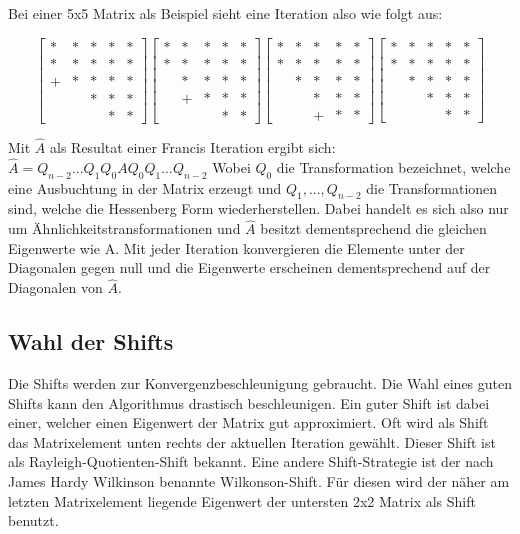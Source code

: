 Bei einer 5x5 Matrix als Beispiel sieht eine Iteration also wie folgt aus:

\begin{equation}
	\begin{bmatrix}
	* & * & * & * & *  \\
	* & * & *  & * & *  \\
	+ & * & * & * & *\\
	&   & * & * & * \\
	&   &   & * & * 
	\end{bmatrix}
	\begin{bmatrix}
	* & * & * & * & *  \\
	* & * & *  & * & *  \\
	& * & * & * & *\\
	&  + & * & * & * \\
	&   &   & * & * 
	\end{bmatrix}
	\begin{bmatrix}
	* & * & * & * & *  \\
	* & * & *  & * & *  \\
	& * & * & * & *\\
	&   & * & * & * \\
	&   &  + & * & * 
	\end{bmatrix}
	\begin{bmatrix}
	* & * & * & * & *  \\
	* & * & *  & * & *  \\
	& * & * & * & *\\
	&   & * & * & * \\
	&   &   & * & * 
	\end{bmatrix}
\end{equation}

Mit $\hat{A}$ als Resultat einer Francis Iteration ergibt sich: $\hat{A}=Q_{n-2}...Q_{1}Q_{0}AQ_{0}Q_{1}...Q_{n-2}$
Wobei $Q_{0}$ die Transformation bezeichnet, welche eine Ausbuchtung in der Matrix erzeugt und $Q_{1},...,Q_{n-2}$ die Transformationen sind, welche die Hessenberg Form wiederherstellen.
Dabei handelt es sich also nur um Ähnlichkeitstransformationen und $\hat{A}$ besitzt dementsprechend die gleichen Eigenwerte wie A.
Mit jeder Iteration konvergieren die Elemente unter der Diagonalen gegen null und die Eigenwerte erscheinen dementsprechend auf der Diagonalen von $\hat{A}$.

\subsection{Wahl der Shifts\label{francis:section:francis_iteration:wahl_shift}}
Die Shifts werden zur Konvergenzbeschleunigung gebraucht.
Die Wahl eines guten Shifts kann den Algorithmus drastisch beschleunigen. 
Ein guter Shift ist dabei einer, welcher einen Eigenwert der Matrix gut approximiert.
Oft wird als Shift das Matrixelement unten rechts der aktuellen Iteration gewählt.
Dieser Shift ist als Rayleigh-Quotienten-Shift bekannt.
Eine andere Shift-Strategie ist der nach James Hardy Wilkinson benannte Wilkonson-Shift.
Für diesen wird der näher am letzten Matrixelement liegende Eigenwert der untersten \glqq 2x2 Matrix \grqq als Shift benutzt.